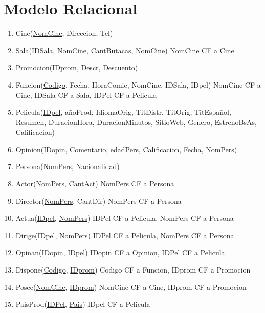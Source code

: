 \documentclass{article}
\begin{document}
\section*{Modelo Relacional}
  \begin{enumerate}
    \item Cine(\underline{NomCine}, Direccion, Tel)
    \item Sala(\underline{IDSala}, \underline{NomCine}, CantButacas, NomCine) \newline
      NomCine CF a Cine
    \item Promocion(\underline{IDprom}, Descr, Descuento)
    \item Funcion(\underline{Codigo}, Fecha, HoraComie, NomCine, IDSala, IDpel) \newline
      NomCine CF a Cine, IDSala CF a Sala, IDPel CF a Pelicula
    \item Pelicula(\underline{IDpel}, añoProd, IdiomaOrig, TitDistr, TitOrig, TitEspañol, Resumen, DuracionHora, DuracionMinutos, SitioWeb, Genero, EstrenoBsAs, Calificacion)
    \item Opinion(\underline{IDopin}, Comentario, edadPers, Calificacion, Fecha, NomPers)
    \item Persona(\underline{NomPers}, Nacionalidad)
    \item Actor(\underline{NomPers}, CantAct) NomPers CF a Persona
    \item Director(\underline{NomPers}, CantDir) NomPers CF a Persona
    \item Actua(\underline{IDpel}, \underline{NomPers}) \newline
      IDPel CF a Pelicula, NomPers CF a Persona
    \item Dirige(\underline{IDpel}, \underline{NomPers}) \newline
      IDPel CF a Pelicula, NomPers CF a Persona
    \item Opinan(\underline{IDopin}, \underline{IDpel}) \newline
      IDopin CF a Opinion, IDPel CF a Pelicula
    \item Dispone(\underline{Codigo}, \underline{IDprom}) \newline
      Codigo CF a Funcion, IDprom CF a Promocion
    \item Posee(\underline{NomCine}, \underline{IDprom}) \newline
      NomCine CF a Cine, IDprom CF a Promocion
    \item PaisProd(\underline{IDPel}, \underline{Pais}) \newline
      IDpel CF a Pelicula
  \end{enumerate}
\end{document}

